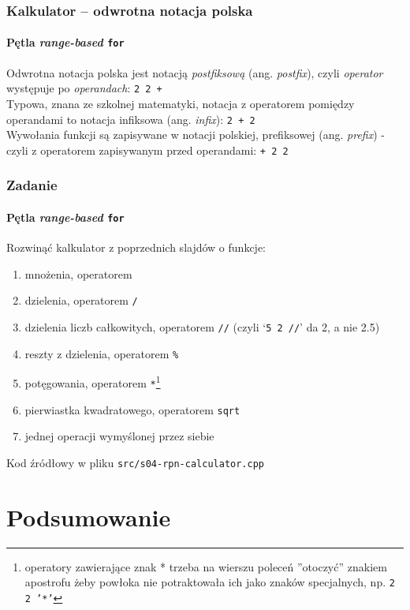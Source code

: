 \documentclass[aspectratio=169]{beamer}
\begin{document}
\begin{frame}
    \frametitle{Kalkulator -- odwrotna notacja polska}
    \framesubtitle{Pętla \emph{range-based} {\tt for}}

    Odwrotna notacja polska jest notacją \emph{postfiksową} (ang.
    \emph{postfix}), czyli \emph{operator} występuje po \emph{operandach}:
    {\tt 2 2 +}\\
    Typowa, znana ze szkolnej matematyki, notacja z operatorem pomiędzy
    operandami to notacja infiksowa (ang. \emph{infix}): {\tt 2 + 2}\\
    Wywołania funkcji są zapisywane w notacji polskiej, prefiksowej (ang.
    \emph{prefix}) - czyli z operatorem zapisywanym przed operandami: {\tt + 2
    2}
\end{frame}

\begin{frame}
    \frametitle{Zadanie}
    \framesubtitle{Pętla \emph{range-based} {\tt for}}
    \label{lecture_exercise_5}

    Rozwinąć kalkulator z poprzednich slajdów o funkcje:

    {\footnotesize
    \begin{enumerate}
        \item mnożenia, operatorem {\tt *}
        \item dzielenia, operatorem {\tt /}
        \item dzielenia liczb całkowitych, operatorem {\tt //} (czyli `{\tt 5 2
            //}' da 2, a nie 2.5)
        \item reszty z dzielenia, operatorem {\tt \%}
        \item potęgowania, operatorem {\tt **}\footnote{operatory zawierające
            znak * trzeba na wierszu poleceń ''otoczyć'' znakiem apostrofu żeby
            powłoka nie potraktowała ich jako znaków specjalnych, np. {\tt 2 2
            '*'}}
        \item pierwiastka kwadratowego, operatorem {\tt sqrt}
        \item jednej operacji wymyślonej przez siebie
    \end{enumerate}}

    Kod źródłowy w pliku {\tt src/s04-rpn-calculator.cpp}
\end{frame}

\section{Podsumowanie}
\end{document}
